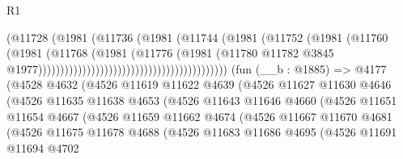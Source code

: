 \begin{lexlean}{R1}
\begin{coremodule}
                                                            (@11728
                                                              (@1981
                                                                (@11736
                                                                  (@1981
                                                                    (@11744
                                                                      (@1981
                                                                        (@11752
                                                                          (@1981
                                                                            (@11760
                                                                              (@1981
                                                                                (@11768
                                                                                  (@1981
                                                                                    (@11776
                                                                                      (@1981
                                                                                        (@11780
                                                                                          @11782
                                                                                          @3845
                                                                                          @1977)))))))))))))))))))))))))))))))))))))))))))
    (fun (__b : @1885) =>
    @4177
      (@4528
        @4632
        (@4526
          @11619
          @11622
          @4639
          (@4526
            @11627
            @11630
            @4646
            (@4526
              @11635
              @11638
              @4653
              (@4526
                @11643
                @11646
                @4660
                (@4526
                  @11651
                  @11654
                  @4667
                  (@4526
                    @11659
                    @11662
                    @4674
                    (@4526
                      @11667
                      @11670
                      @4681
                      (@4526
                        @11675
                        @11678
                        @4688
                        (@4526
                          @11683
                          @11686
                          @4695
                          (@4526
                            @11691
                            @11694
                            @4702

\end{coremodule}
\end{lexlean}

